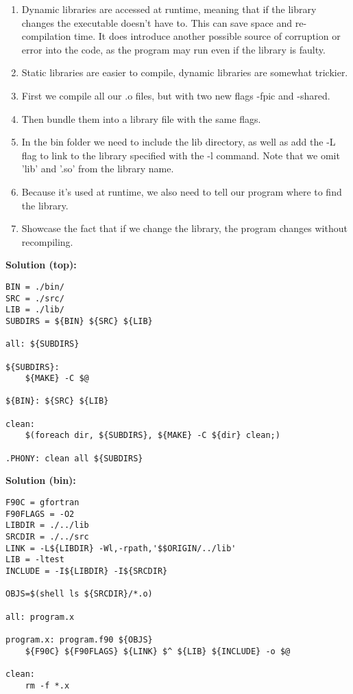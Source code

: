 \documentclass{article}
\begin{document}
\begin{enumerate}
\item Dynamic libraries are accessed at runtime, meaning that if the library changes the executable doesn't have to. This can save space and re-compilation time. It does introduce another possible source of corruption or error into the code, as the program may run even if the library is faulty.
\item Static libraries are easier to compile, dynamic libraries are somewhat trickier.
\item First we compile all our .o files, but with two new flags -fpic and -shared.
\item Then bundle them into a library file with the same flags.
\item In the bin folder we need to include the lib directory, as well as add the -L flag to link to the library specified with the -l command. Note that we omit 'lib' and '.so' from the library name.
\item Because it's used at runtime, we also need to tell our program where to find the library.
\item Showcase the fact that if we change the library, the program changes without recompiling. 
\end{enumerate}

{\bf Solution (top):}
\begin{lstlisting}
BIN = ./bin/
SRC = ./src/
LIB = ./lib/
SUBDIRS = ${BIN} ${SRC} ${LIB}

all: ${SUBDIRS}

${SUBDIRS}:
	${MAKE} -C $@

${BIN}: ${SRC} ${LIB}

clean:
	$(foreach dir, ${SUBDIRS}, ${MAKE} -C ${dir} clean;)

.PHONY: clean all ${SUBDIRS}

\end{lstlisting}

{\bf Solution (bin):}
\begin{lstlisting}
F90C = gfortran
F90FLAGS = -O2
LIBDIR = ./../lib
SRCDIR = ./../src
LINK = -L${LIBDIR} -Wl,-rpath,'$$ORIGIN/../lib'
LIB = -ltest
INCLUDE = -I${LIBDIR} -I${SRCDIR}

OBJS=$(shell ls ${SRCDIR}/*.o)

all: program.x

program.x: program.f90 ${OBJS}
	${F90C} ${F90FLAGS} ${LINK} $^ ${LIB} ${INCLUDE} -o $@

clean:
	rm -f *.x
\end{lstlisting}
\end{document}
